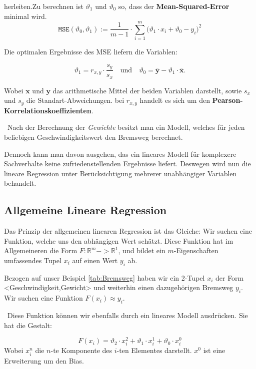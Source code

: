 herleiten.Zu berechnen ist $\vartheta_1$ und $\vartheta_0$ so, dass der \textbf{Mean-Squared-Error} minimal wird. 
\begin{equation}
\label{eq:mse}
\mathtt{MSE}(\vartheta_0, \vartheta_1) := \frac{1}{m-1} \cdot \sum\limits_{i=1}^m \bigl(\vartheta_1 \cdot x_i + \vartheta_0 - y_i\bigr)^2
\end{equation}

Die optimalen Ergebnisse des MSE liefern die Variablen:

\begin{equation}
\label{eq:theta0}
\vartheta_1 = r_{x,y} \cdot \frac{s_y}{s_x} \quad \mbox{und} \quad \vartheta_0 = \bar{\mathbf{y}} - \vartheta_1 \cdot \bar{\mathbf{x}}.
\end{equation}

Wobei $\mathbf{x}$ und $\mathbf{y}$ das arithmetische Mittel der beiden Variablen darstellt, sowie $s_x$ und $s_y$ die Standart-Abweichungen. bei $r_{x,y}$ handelt es sich um den \textbf{Pearson-Korrelationskoeffizienten}. 

~\newline Nach der Berechnung der \textit{Gewichte} besitzt man ein Modell, welches für jeden beliebigen Geschwindigkeitswert den Bremsweg berechnet. 

Dennoch kann man davon ausgehen, das ein lineares Modell für komplexere Sachverhalte keine zufriedenstellenden Ergebnisse liefert. Deswegen wird nun die lineare Regression unter Berücksichtigung mehrerer unabhängiger Variablen behandelt. 
\subsection{Allgemeine Lineare Regression}
Das Prinzip der allgemeinen linearen Regression ist das Gleiche: Wir suchen eine Funktion, welche uns den abhängigen Wert schätzt. Diese Funktion hat im Allgemeineren die Form  $F:\mathbb{R}^m -> \mathbb{R}^1$, und bildet ein $m$-Eigenschaften umfassendes Tupel $x_i$ auf einen Wert $y_i$ ab. 

Bezogen auf unser Beispiel \ref{tab:Bremsweg} haben wir ein 2-Tupel $x_i$ der Form <Geschwindigkeit,Gewicht> und weiterhin einen dazugehörigen Bremsweg $y_i$. Wir suchen eine Funktion $F(x_i) \approx y_i$. 

~\newline Diese Funktion können wir ebenfalls durch ein lineares Modell ausdrücken. Sie hat die Gestalt: 

\begin{equation}
	F(x_i)= \vartheta_2 \cdot x^2_i + \vartheta_1 \cdot x^1_i + \vartheta_0 \cdot x^0_i
\end{equation}
Wobei $x^n_i$ die $n$-te Komponente des $i$-ten Elementes darstellt. $x^0$ ist eine Erweiterung um den Bias.


